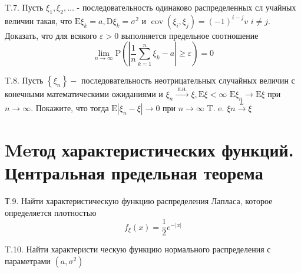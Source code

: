 \documentclass[a4paper,12pt]{article} %
\begin{document}
\begin{example}

T.7. Пусть $\xi_{1}, \xi_{2}, \ldots$ - последовательность одинаково распределенных сл учайных величин такая, что $\mathrm{E} \xi_{k}=a, \mathrm{D} \xi_{k}=\sigma^{2}$ и $\operatorname{cov}\left(\xi_{i}, \xi_{j}\right)=(-1)^{i-j} v$
$i \neq j .$ 
Доказать, что для всякого $\varepsilon>0$ выполняется предельное соотношение
$$
\lim _{n \rightarrow \infty} \mathrm{P}\left(\left|\frac{1}{n} \sum_{k=1}^{n} \xi_{k}-a\right| \geq \varepsilon\right)=0
$$




\end{example}





\begin{example}


T.8. Пусть $\left\{\xi_{n}\right\}-$ последовательность неотрицательных случайных величин с конечными математическими ожиданиями и $\xi_{n} \stackrel{\text { п.н. }}{\rightarrow} \xi, \mathrm{E} \xi<\infty$ $\mathrm{E} \xi_{n} \rightarrow \mathrm{E} \xi$ при $n \rightarrow \infty .$ Покажите, что тогда $\mathrm{E}\left|\xi_{n}-\xi\right| \rightarrow 0$ при $n \rightarrow \infty$
T. e. $\xi n \stackrel{L}{\rightarrow} \xi$



\end{example}



\section{Meтод характеристических функций. Центральная предельная теорема}



\begin{example}


Т.9. Найти характеристическую функцию распределения Лапласа, которое определяется плотностью
$$
f_{\xi}(x)=\frac{1}{2} e^{-|x|}
$$





\end{example}



\begin{example}

T.10. Найти характеристи ческую функцию нормального распределения с параметрами $\left(a, \sigma^{2}\right)$




\end{example}
\end{document}
